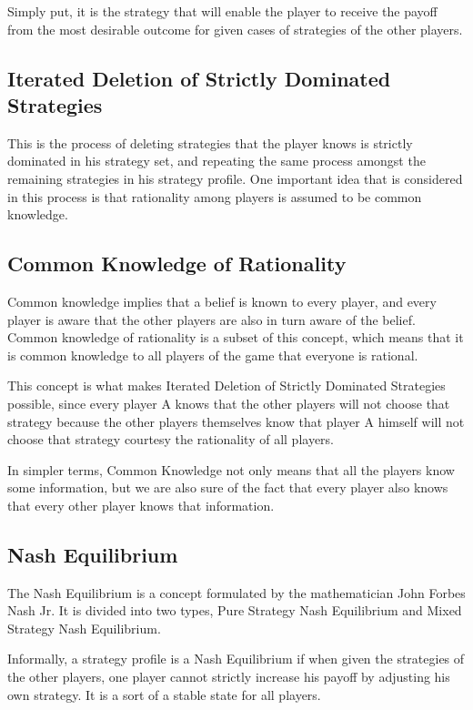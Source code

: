 \documentclass[11pt]{article}
\theoremstyle{definition}
\begin{document}
Simply put, it is the strategy that will enable the player to receive the payoff from the most desirable outcome for given cases of strategies of the other players.

\subsection{Iterated Deletion of Strictly Dominated Strategies}
This is the process of deleting strategies that the player knows is strictly dominated in his strategy set, and repeating the same process amongst the remaining strategies in his strategy profile. One important idea that is considered in this process is that rationality among players is assumed to be common knowledge.

\subsection{Common Knowledge of Rationality}
Common knowledge implies that a belief is known to every player, and every player is aware that the other players are also in turn aware of the belief. Common knowledge of rationality is a subset of this concept, which means that it is common knowledge to all players of the game that everyone is rational. 

This concept is what makes Iterated Deletion of Strictly Dominated Strategies possible, since every player A knows that the other players will not choose that strategy because the other players themselves know that player A himself will not choose that strategy courtesy the rationality of all players. 

In simpler terms, Common Knowledge not only means that all the players know some information, but we are also sure of the fact that every player also knows that every other player knows that information.

\subsection{Nash Equilibrium}
The Nash Equilibrium is a concept formulated by the mathematician John Forbes Nash Jr. It is divided into two types, Pure Strategy Nash Equilibrium and Mixed Strategy Nash Equilibrium. 

Informally, a strategy profile is a Nash Equilibrium if when given the strategies of the other players, one player cannot strictly increase his payoff by adjusting his own strategy. It is a sort of a stable state for all players. 
\end{document}
